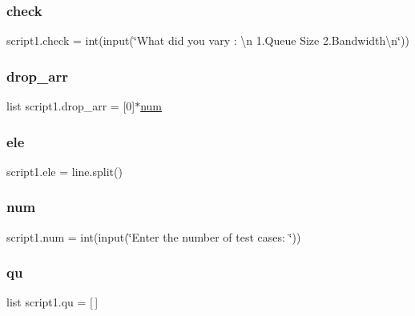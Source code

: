\mbox{\label{namespacescript1_a912cbac0689717960fafa517297a0711}} 
\subsubsection{\texorpdfstring{check}{check}}
{\footnotesize\ttfamily script1.\+check = int(input(\char`\"{}What did you vary \+: \textbackslash{}n 1.Queue Size 2.Bandwidth\textbackslash{}n\char`\"{}))}

\mbox{\label{namespacescript1_aab2ba988c46214b8dce6d1748efe7411}} 
\subsubsection{\texorpdfstring{drop\+\_\+arr}{drop\_arr}}
{\footnotesize\ttfamily list script1.\+drop\+\_\+arr = \mbox{[}0\mbox{]}$\ast$\hyperlink{namespacescript1_af3563b114fce201545380250b0275b6b}{num}}

\mbox{\label{namespacescript1_aecd146a4e9abc4438d8826460a90d182}} 
\subsubsection{\texorpdfstring{ele}{ele}}
{\footnotesize\ttfamily script1.\+ele = line.\+split()}

\mbox{\label{namespacescript1_af3563b114fce201545380250b0275b6b}} 
\subsubsection{\texorpdfstring{num}{num}}
{\footnotesize\ttfamily script1.\+num = int(input(\char`\"{}Enter the number of test cases\+: \char`\"{}))}

\mbox{\label{namespacescript1_a68ee82d62939b12848148284afe0c215}} 
\subsubsection{\texorpdfstring{qu}{qu}}
{\footnotesize\ttfamily list script1.\+qu = \mbox{[}$\,$\mbox{]}}


